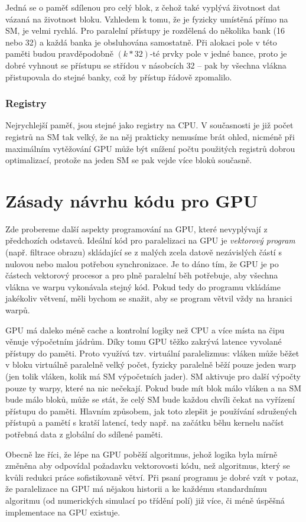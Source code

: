 Jedná se o paměť sdílenou pro celý blok, z čehož také vyplývá životnost dat vázaná na životnost bloku. Vzhledem k tomu, že je fyzicky umístěná přímo na SM, je velmi rychlá. Pro paralelní přístupy je rozdělená do několika bank (16 nebo 32) a každá banka je obsluhována samostatně. Při alokaci pole v této paměti budou pravděpodobně $(k*32)$-té prvky pole v jedné bance, proto je dobré vyhnout se přístupu se střídou v násobcích 32  -- pak by všechna vlákna přistupovala do stejné banky, což by přístup řádově zpomalilo.

\subsubsection{Registry}

Nejrychlejší paměť, jsou stejné jako registry na CPU. V současnosti je již počet registrů na SM tak velký, že na něj prakticky nemusíme brát ohled, nicméně při maximálním vytěžování GPU může být snížení počtu použitých registrů dobrou optimalizací, protože na jeden SM se pak vejde více bloků současně.

\section{Zásady návrhu kódu pro GPU}

Zde probereme další aspekty programování na GPU, které nevyplývají z předchozích odstavců. Ideální kód pro paralelizaci na GPU je \emph{vektorový program} (např. filtrace obrazu) skládající se z malých zcela datově nezávislých částí s nulovou nebo malou potřebou synchronizace. Je to dáno tím, že GPU je po částech vektorový procesor a pro plně paralelní běh potřebuje, aby všechna vlákna ve warpu vykonávala stejný kód. Pokud tedy do programu vkládáme jakékoliv větvení, měli bychom se snažit, aby se program větvil vždy na hranici warpů.

GPU má daleko méně cache a kontrolní logiky než CPU a více místa na čipu věnuje výpočetním jádrům. Díky tomu GPU těžko zakrývá latence vyvolané přístupy do paměti. Proto využívá tzv. virtuální paralelizmus: vláken může běžet v bloku virtuálně paralelně velký počet, fyzicky paralelně běží pouze jeden warp (jen tolik vláken, kolik má SM výpočetních jader). SM aktivuje pro další výpočty pouze ty warpy, které na nic nečekají. Pokud bude mít blok málo vláken a na SM bude málo bloků, může se stát, že celý SM bude každou chvíli čekat na vyřízení přístupu do paměti. Hlavním způsobem, jak toto zlepšit je používání sdružených přístupů a pamětí s kratší latencí, tedy např. na začátku běhu kernelu načíst potřebná data z globální do sdílené paměti.

Obecně lze říci, že lépe na GPU poběží algoritmus, jehož logika byla mírně změněna aby odpovídal požadavku vektorovosti kódu, než algoritmus, který se kvůli redukci práce sofistikovaně větví. Při psaní programu je dobré vzít v potaz, že paralelizace na GPU má nějakou historii a ke každému standardnímu algoritmu (od numerických simulací po třídění polí) již více, či méně úspěšná implementace na GPU existuje.
